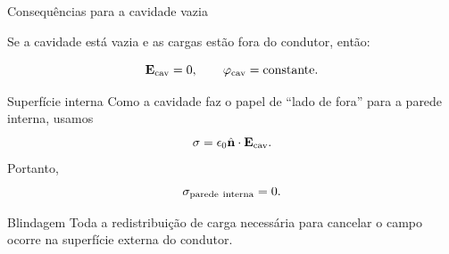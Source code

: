 \documentclass[aspectratio=169]{beamer}
\begin{document}
\begin{frame}{Consequências para a cavidade vazia}

\footnotesize

Se a cavidade está vazia e as cargas estão fora do condutor, então:

\begin{eqbox}
\begin{equation}
\mathbf E_{\rm cav}=0,
\qquad
\varphi_{\rm cav}=\text{constante}.
\label{eq:cavidade-vazia-campo-zero}
\end{equation}
\end{eqbox}

\begin{mybox}{Superfície interna}
Como a cavidade faz o papel de ``lado de fora'' para a parede interna, usamos
\[
\sigma=\epsilon_0\hat{\mathbf n}\cdot \mathbf E_{\rm cav}.
\]
Portanto,
\[
\sigma_{\rm parede\ interna}=0.
\]
\end{mybox}

\begin{alertblock}{Blindagem}
Toda a redistribuição de carga necessária para cancelar o campo ocorre na
superfície externa do condutor.
\end{alertblock}

\end{frame}
\end{document}
